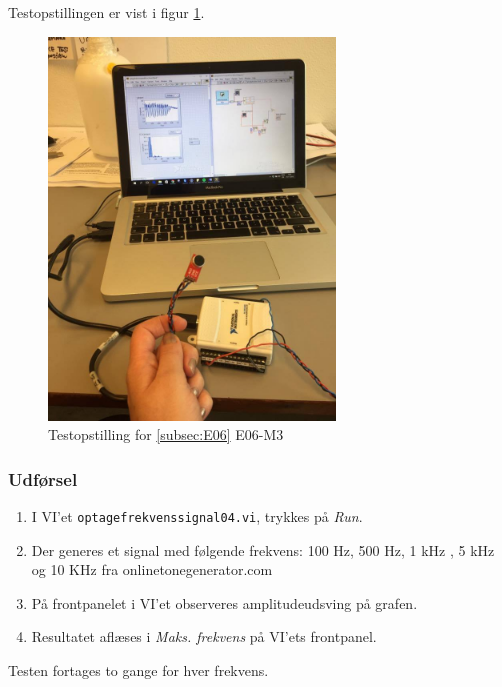 		Testopstillingen er vist i figur \ref{fig:webop}.\\
		
		\begin{figure}
			\centering
			\includegraphics[width=3in]{webcamop.jpg}
			\caption{Testopstilling for \ref{subsec:E06} E06-M3}
			\label{fig:webop}
		\end{figure}
	
		\subsubsection{Udførsel}
			\begin{enumerate}
				\item I VI'et \texttt{optagefrekvenssignal04.vi}, trykkes på \textit{Run}.  
				\item Der generes et signal med følgende frekvens: 100 Hz, 500 Hz, 1 kHz , 5 kHz og 10 KHz fra onlinetonegenerator.com
				\item På frontpanelet i VI'et observeres amplitudeudsving på grafen.  
				\item Resultatet aflæses i \textit{Maks. frekvens} på VI'ets frontpanel.
			\end{enumerate}
			
			Testen fortages to gange for hver frekvens.  
		
